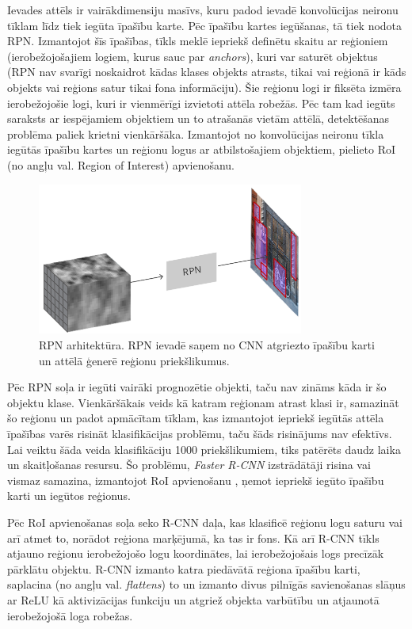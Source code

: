 Ievades attēls ir vairākdimensiju masīvs, kuru padod ievadē konvolūcijas neironu tīklam līdz tiek iegūta īpašību karte. Pēc īpašību kartes iegūšanas, tā tiek nodota RPN. Izmantojot šīs īpašības, tīkls meklē iepriekš definētu skaitu ar reģioniem (ierobežojošajiem logiem, kurus sauc par \textit{anchors}), kuri var saturēt objektus (RPN nav svarīgi noskaidrot kādas klases objekts atrasts, tikai vai reģionā ir kāds objekts vai reģions satur tikai fona informāciju).  Šie reģionu logi ir fiksēta izmēra ierobežojošie logi, kuri ir vienmērīgi izvietoti attēla robežās. Pēc tam kad iegūts saraksts ar iespējamiem objektiem un to atrašanās vietām attēlā, detektēšanas problēma paliek krietni vienkāršāka. Izmantojot no konvolūcijas neironu tīkla iegūtās īpašību kartes un reģionu logus ar atbilstošajiem objektiem, pielieto RoI (no angļu val. Region of Interest) apvienošanu.
\begin{figure}[h]%
	\centering
	\includegraphics[height=5cm]{images/rpnstep.png} %
	\caption{RPN arhitektūra. RPN ievadē saņem no CNN atgriezto īpašību karti un attēlā ģenerē reģionu priekšlikumus. \cite{rpnarch}}%
	\label{fig:example}%
\end{figure}
Pēc RPN soļa ir iegūti vairāki prognozētie objekti, taču nav zināms kāda ir šo objektu klase. Vienkāršākais veids kā katram reģionam atrast klasi ir, samazināt šo reģionu un padot apmācītam tīklam, kas izmantojot iepriekš iegūtās attēla īpašības varēs risināt klasifikācijas problēmu, taču šāds risinājums nav efektīvs. Lai veiktu šāda veida klasifikāciju 1000 priekšlikumiem, tiks patērēts daudz laika un skaitļošanas resursu. Šo problēmu, \textit{Faster R-CNN} izstrādātāji risina vai vismaz samazina, izmantojot RoI apvienošanu \cite{roipooling}, ņemot iepriekš iegūto īpašību karti un iegūtos reģionus. 

Pēc RoI apvienošanas soļa seko R-CNN daļa, kas klasificē reģionu logu saturu vai arī atmet to, norādot reģiona marķējumā, ka tas ir fons. Kā arī R-CNN tīkls atjauno reģionu ierobežojošo logu koordinātes, lai ierobežojošais logs precīzāk pārklātu objektu. R-CNN izmanto katra piedāvātā reģiona īpašību karti, saplacina (no angļu val. \textit{flattens}) to un izmanto divus pilnīgās savienošanas slāņus ar ReLU kā aktivizācijas funkciju un atgriež objekta varbūtību un atjaunotā ierobežojošā loga robežas.

